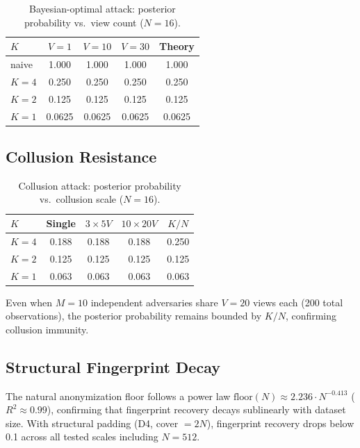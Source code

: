 \documentclass[11pt]{article}
\begin{document}
\begin{table}[t]
\centering
\caption{Bayesian-optimal attack: posterior probability vs.\ view count ($N=16$).}
\label{tab:bayesian}
\begin{tabular}{@{}lcccc@{}}
\toprule
$K$ & $V=1$ & $V=10$ & $V=30$ & Theory \\
\midrule
naive  & 1.000  & 1.000  & 1.000  & 1.000 \\
$K=4$  & 0.250  & 0.250  & 0.250  & 0.250 \\
$K=2$  & 0.125  & 0.125  & 0.125  & 0.125 \\
$K=1$  & 0.0625 & 0.0625 & 0.0625 & 0.0625 \\
\bottomrule
\end{tabular}
\end{table}

\subsection{Collusion Resistance}

\begin{table}[t]
\centering
\caption{Collusion attack: posterior probability vs.\ collusion scale ($N=16$).}
\label{tab:collusion}
\begin{tabular}{@{}lcccc@{}}
\toprule
$K$ & Single & $3 \times 5V$ & $10 \times 20V$ & $K/N$ \\
\midrule
$K=4$ & 0.188 & 0.188 & 0.188 & 0.250 \\
$K=2$ & 0.125 & 0.125 & 0.125 & 0.125 \\
$K=1$ & 0.063 & 0.063 & 0.063 & 0.063 \\
\bottomrule
\end{tabular}
\end{table}

Even when $M=10$ independent adversaries share $V=20$ views each (200 total observations), the posterior probability remains bounded by $K/N$, confirming collusion immunity.

\subsection{Structural Fingerprint Decay}

The natural anonymization floor follows a power law $\text{floor}(N) \approx 2.236 \cdot N^{-0.413}$ ($R^2 \approx 0.99$), confirming that fingerprint recovery decays sublinearly with dataset size. With structural padding (D4, cover $= 2N$), fingerprint recovery drops below 0.1 across all tested scales including $N=512$.
\end{document}
